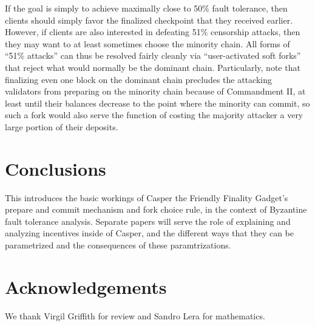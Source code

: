\documentclass[12pt, final]{article}
\begin{document}
If the goal is simply to achieve maximally close to 50\% fault tolerance, then clients should simply favor the finalized checkpoint that they received earlier. However, if clients are also interested in defeating 51\% censorship attacks, then they may want to at least sometimes choose the minority chain. All forms of ``51\% attacks'' can thus be resolved fairly cleanly via ``user-activated soft forks'' that reject what would normally be the dominant chain. Particularly, note that finalizing even one block on the dominant chain precludes the attacking validators from preparing on the minority chain because of Commandment II, at least until their balances decrease to the point where the minority can commit, so such a fork would also serve the function of costing the majority attacker a very large portion of their deposits.

\section{Conclusions}

This introduces the basic workings of Casper the Friendly Finality Gadget's prepare and commit mechanism and fork choice rule, in the context of Byzantine fault tolerance analysis. Separate papers will serve the role of explaining and analyzing incentives inside of Casper, and the different ways that they can be parametrized and the consequences of these paramtrizations.

\section{Acknowledgements}

We thank Virgil Griffith for review and Sandro Lera for mathematics.





%

\end{document}
